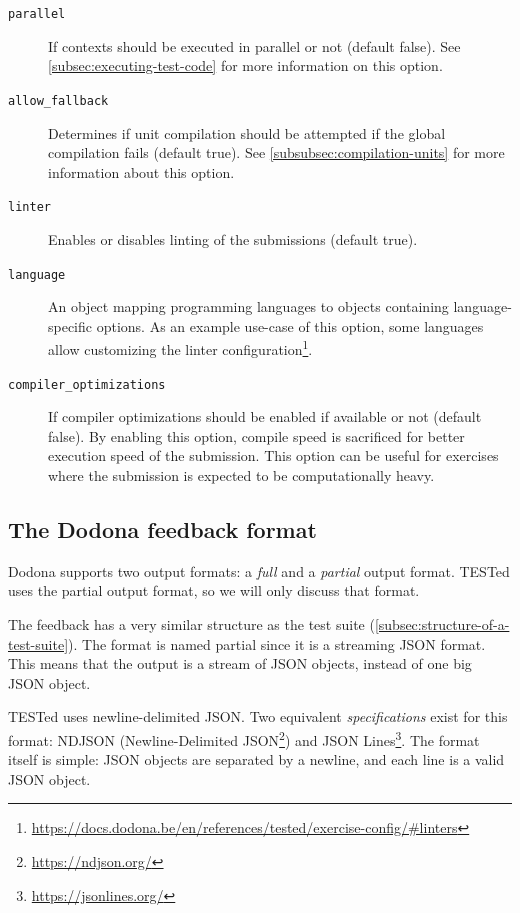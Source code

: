 \documentclass[../main]{subfiles}
\begin{document}
\begin{description}
    \item[\texttt{parallel}] If contexts should be executed in parallel or not (default false). See \vref{subsec:executing-test-code} for more information on this option.
    \item[\texttt{allow\_fallback}] Determines if unit compilation should be attempted if the global compilation fails (default true). See \vref{subsubsec:compilation-units} for more information about this option.
    \item[\texttt{linter}] Enables or disables linting of the submissions (default true).
    \item[\texttt{language}] An object mapping programming languages to objects containing language-specific options.
    As an example use-case of this option, some languages allow customizing the linter configuration\footnote{\url{https://docs.dodona.be/en/references/tested/exercise-config/\#linters}}.
    \item[\texttt{compiler\_optimizations}] If compiler optimizations should be enabled if available or not (default false).
    By enabling this option, compile speed is sacrificed for better execution speed of the submission.
    This option can be useful for exercises where the submission is expected to be computationally heavy.
\end{description}

\subsection{The Dodona feedback format}\label{subsec:dodona-output}

Dodona supports two output formats: a \emph{full} and a \emph{partial} output format.
TESTed uses the partial output format, so we will only discuss that format.

The feedback has a very similar structure as the test suite (\vref{subsec:structure-of-a-test-suite}).
The format is named partial since it is a streaming JSON format.
This means that the output is a stream of JSON objects, instead of one big JSON object.

TESTed uses newline-delimited JSON\@.
Two equivalent \emph{specifications} exist for this format: NDJSON (Newline-Delimited JSON\footnote{\url{https://ndjson.org/}}) and JSON Lines\footnote{\url{https://jsonlines.org/}}.
The format itself is simple: JSON objects are separated by a newline, and each line is a valid JSON object.
\end{document}
